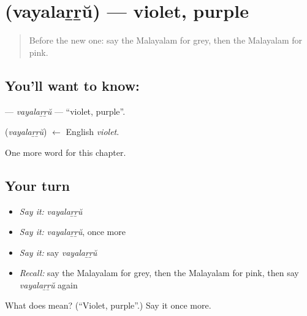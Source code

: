 \section[\texorpdfstring{\ml{വയലറ്റ്} (vayalaṟṟŭ)}{വയലറ്റ് (vayalaṟṟŭ)}]{ (vayalaṟṟŭ) — violet, purple}

\label{lesson:ML-C245-vayalarru}



\begin{quote}
Before the new one: say the Malayalam for grey, then the Malayalam for pink.
\end{quote}

\subsection*{You'll want to know: }
\textbf{} — \emph{vayalaṟṟŭ} — \textquotedblleft{}violet, purple\textquotedblright{}.

\begin{cousinweb}
\textbf{} (\emph{vayalaṟṟŭ}) $\leftarrow$ English \emph{violet}.
\end{cousinweb}

\begin{grammarlens}[title={What you've built}]
One more word for this chapter.
\end{grammarlens}

\subsection*{Your turn}
\begin{itemize}
\raggedright
  \item \emph{Say it:} \emph{vayalaṟṟŭ}
  \item \emph{Say it:} \emph{vayalaṟṟŭ}, once more
  \item \emph{Say it:} say \emph{vayalaṟṟŭ}
  \item \emph{Recall:} say the Malayalam for grey, then the Malayalam for pink, then say \emph{vayalaṟṟŭ} again
\end{itemize}

\begin{tcolorbox}[breakable,colback=teal!4,colframe=teal!35!black,title={Before you move on}]
What does  mean? (\textquotedblleft{}Violet, purple\textquotedblright{}.) Say it once more.
\end{tcolorbox}
